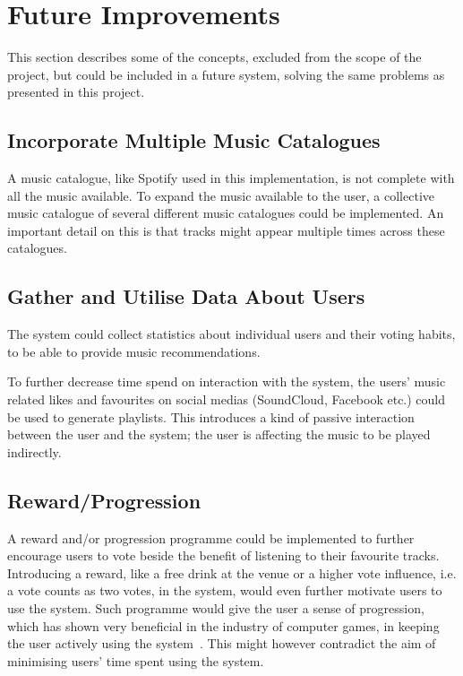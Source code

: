 \chapter{Future Improvements}
\label{future}

This section describes some of the concepts, excluded from the scope of the project, but could be included in a future system, solving the same problems as presented in this project.

\section{Incorporate Multiple Music Catalogues}
A music catalogue, like Spotify used in this implementation, is not complete with all the music available. To expand the music available to the user, a collective music catalogue of several different music catalogues could be implemented. An important detail on this is that tracks might appear multiple times across these catalogues.

\section{Gather and Utilise Data About Users}
The system could collect statistics about individual users and their voting habits, to be able to provide music recommendations.

To further decrease time spend on interaction with the system, the users' music related likes and favourites on social medias (SoundCloud, Facebook etc.) could be used to generate playlists. This introduces a kind of passive interaction between the user and the system; the user is affecting the music to be played indirectly.

\section{Reward/Progression}
A reward and/or progression programme could be implemented to further encourage users to vote beside the benefit of listening to their favourite tracks. Introducing a reward, like a free drink at the venue or a higher vote influence, i.e. a vote counts as two votes, in the system, would even further motivate users to use the system. Such programme would give the user a sense of progression, which has shown very beneficial in the industry of computer games, in keeping the user actively using the system~\cite{games}. This might however contradict the aim of minimising users' time spent using the system.


